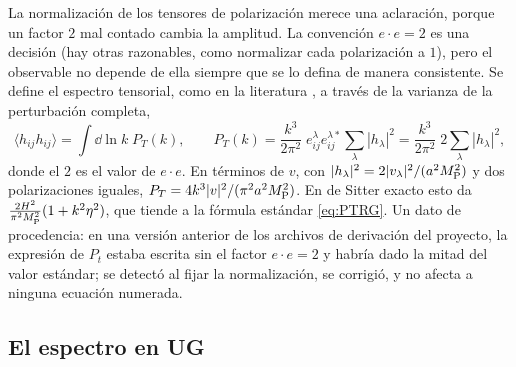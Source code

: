 La normalización de los tensores de polarización merece una aclaración, porque un factor $2$ mal contado cambia la amplitud. La convención $e\cdot e=2$ es una decisión (hay otras razonables, como normalizar cada polarización a $1$), pero el observable no depende de ella siempre que se lo defina de manera consistente. Se define el espectro tensorial, como en la literatura \cite{martin14,baumann22}, a través de la varianza de la perturbación completa,
\begin{equation}
\langle h_{ij}h_{ij}\rangle=\int\dd\ln k\;P_T(k),\qquad
P_T(k)=\frac{k^3}{2\pi^2}\;e^\lambda_{ij}e^{\lambda*}_{ij}\sum_\lambda|h_\lambda|^2=\frac{k^3}{2\pi^2}\;2\sum_\lambda|h_\lambda|^2,
\label{eq:PTdef}
\end{equation}
donde el $2$ es el valor de $e\cdot e$. En términos de $v$, con $|h_\lambda|^2=2|v_\lambda|^2/(a^2M_{\rm P}^2)$ y dos polarizaciones iguales, $P_T=4k^3|v|^2/(\pi^2a^2M_{\rm P}^2)$. En de Sitter exacto esto da $\frac{2H^2}{\pi^2M_{\rm P}^2}(1+k^2\eta^2)$, que tiende a la fórmula estándar \eqref{eq:PTRG}. Un dato de procedencia: en una versión anterior de los archivos de derivación del proyecto, la expresión de $P_t$ estaba escrita sin el factor $e\cdot e=2$ y habría dado la mitad del valor estándar; se detectó al fijar la normalización, se corrigió, y no afecta a ninguna ecuación numerada.

\subsection{El espectro en UG}

